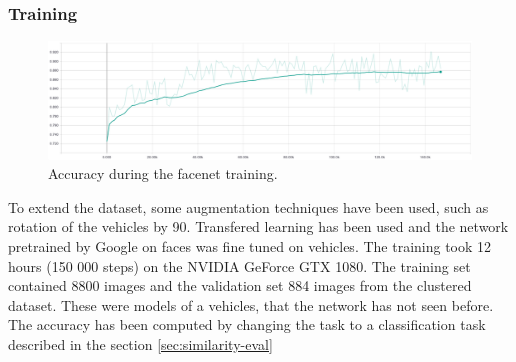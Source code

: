 \documentclass[a4paper,12pt,titlepage, twoside]{article}
\numberwithin{figure}{section}
\begin{document}
\subsubsection{Training}
\begin{figure}[h!]
\centering
\includegraphics[width=1\linewidth]{fig/facenet/acc.png}
\caption{Accuracy during the facenet training.}
\label{fig:facenet_training}
\end{figure}

To extend the dataset, some augmentation techniques have been used, such as rotation of the vehicles by 90\textdegree. Transfered learning has been used and the network pretrained by Google on faces was fine tuned on vehicles. The training took 12 hours (150 000 steps) on the NVIDIA GeForce GTX 1080. The training set contained 8800 images and the validation set 884 images from the clustered dataset. These were models of a vehicles, that the network has not seen before. The accuracy has been computed by changing the task to a classification task described in the section \ref{sec:similarity-eval}
\end{document}

